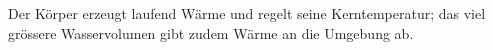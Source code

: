 Der Körper erzeugt laufend Wärme und regelt seine Kerntemperatur; das viel grössere Wasservolumen gibt zudem Wärme an die Umgebung ab.
